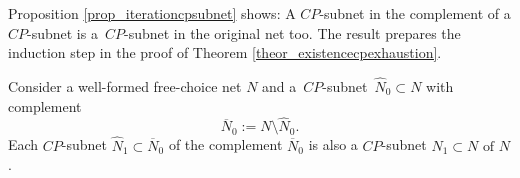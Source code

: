 \documentclass{fundam}
\begin{document}
\begin{flushleft}
Proposition \ref{prop_iterationcpsubnet} shows: A $CP$-subnet in the complement of a $CP$-subnet is \mbox{a $CP$-subnet} in the original net too. The result prepares the induction step in the proof of Theorem \ref{theor_existencecpexhaustion}.
\end{flushleft}
\begin{proposition}\label{prop_iterationcpsubnet}
Consider a well-formed free-choice net $N$ and \mbox{a $CP$-subnet $\hat{N}_0 \subset N$} with complement
$$\overline{N}_0:=N \setminus \hat{N}_0.$$
Each $CP$-subnet $\hat{N}_1 \subset \overline{N}_0$ of the complement $\overline{N}_0$ is also a $CP$-subnet $\hat{N}_1 \subset N \text{ of } N$.
\end{proposition}
\end{document}

